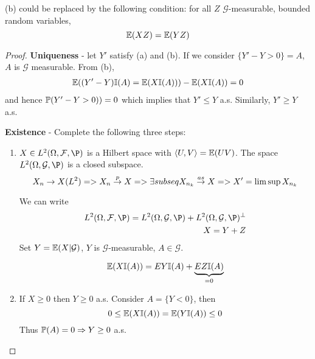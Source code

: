 \begin{remark}
  (b) could be replaced by the following condition: for all $Z$
  $\mathcal{G}$-measurable, bounded random variables,
  \begin{equation}
    \label{exmp:general:2}
    \E{XZ} = \E{YZ}
  \end{equation}
\end{remark}

\begin{proof}

  \textbf{Uniqueness} - let $Y'$ satisfy (a) and (b).  If we consider
  $\{Y' - Y > 0 \} = A$, $A$ is $\mathcal{G}$ measurable.
  From (b),
  \begin{align*}
    \E{(Y' - Y)\I{A} = \E{X\I{A}}} - \E{X
      \I{A}} = 0
  \end{align*} and hence $\Prob{Y' - Y > 0)} = 0$ which implies that $Y'
    \leq Y$ a.s.  Similarly, $Y' \geq Y$ a.s.

  \textbf{Existence} - Complete the following three steps:
  \begin{enumerate}
  \item $X \in L^2(\Omega, \mathcal{F}, \P)$ is a Hilbert space with
    $\langle U, V \rangle = \E{UV}$.
    The space $L^{2}(\Omega, \mathcal{G}, \P)$ is a closed
    subspace.
    \begin{equation}
      \label{exmp:general:3}
      X_{n} \rightarrow X (L^{2}) => X_{n} \overset{p}{\rightarrow} X => \exists subseq
      X_{n_{k}} \overset{as}{\rightarrow} X => X' = \limsup X_{n_{k}}
    \end{equation}

  We can write
  \begin{align*}
    L^{2}(\Omega, \mathcal{F}, \P) = L^{2}(\Omega, \mathcal{G}, \P) +
    L^{2}(\Omega, \mathcal{G}, \P)^{\perp} \\
    X = Y + Z
  \end{align*}  Set $Y = \E{X | \mathcal{G}}$, $Y$ is
  $\mathcal{G}$-measurable, $A \in \mathcal{G}$.
  
  \begin{align*}
    \E{X \I{A}} = E{Y \I{A}} + \underbrace{E{Z \I{A}}}_{=0}
  \end{align*}
  
\item   If $X \geq 0$ then $Y \geq 0$ a.s. Consider $A = \{ Y < 0 \}$, then
  \begin{equation}
    \label{exmp:general:4}
    0 \leq \E{X \I{A}} = \E{Y \I{A}} \leq 0
  \end{equation}
  Thus $\Prob{A} = 0 \Rightarrow Y \geq 0$ a.s.


\end{enumerate}
\end{proof}
